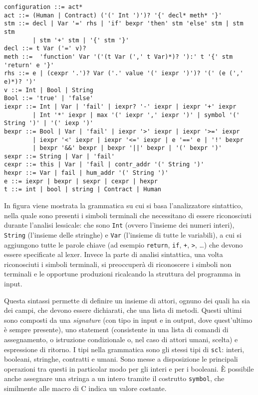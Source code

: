 \documentclass[12pt,a4paper]{report}
\begin{document}
\begin{verbatim}
configuration ::= act*
act ::= (Human | Contract) ('(' Int ')')? '{' decl* meth* '}'
stm ::= decl | Var '=' rhs | 'if' bexpr 'then' stm 'else' stm | stm stm 
        | stm '+' stm | '{' stm '}'
decl ::= t Var ('=' v)?
meth ::=  'function' Var '('(t Var (',' t Var)*)? '):' t '{' stm 'return' e '}'
rhs ::= e | (cexpr '.')? Var ('.' value '(' iexpr ')')? '(' (e (',' e)*)? ')'
v ::= Int | Bool | String 
Bool ::= 'true' | 'false' 
iexpr ::= Int | Var | 'fail' | iexpr? '-' iexpr | iexpr '+' iexpr 
        | Int '*' iexpr | max '(' iexpr ',' iexpr ')' | symbol '(' String ')' | '(' iexp ')'
bexpr ::= Bool | Var | 'fail' | iexpr '>' iexpr | iexpr '>=' iexpr 
        | iexpr '<' iexpr | iexpr '<=' iexpr | e '==' e | '!' bexpr 
        | bexpr '&&' bexpr | bexpr '||' bexpr | '(' bexpr ')'  
sexpr ::= String | Var | 'fail'
cexpr ::= this | Var | 'fail | contr_addr '(' String ')'
hexpr ::= Var | fail | hum_addr '(' String ')'
e ::= iexpr | bexpr | sexpr | cexpr | hexpr 
t ::= int | bool | string | Contract | Human
\end{verbatim}

In figura viene mostrata la grammatica su cui si basa l'analizzatore
sintattico, nella quale sono presenti i simboli terminali che
necessitano di essere riconosciuti durante l'analisi lessicale: che sono
\texttt{Int} (ovvero l'insieme dei numeri interi), \texttt{String}
(l'insieme delle stringhe) e \texttt{Var} (l'insieme di tutte le
variabili), a cui si aggiungono tutte le parole chiave (ad esempio
\texttt{return}, \texttt{if}, \texttt{+}, \texttt{\textgreater{}},
\ldots{}) che devono essere specificate al lexer. Invece la parte di
analisi sintattica, una volta riconosciuti i simboli terminali, si
preoccuperà di riconoscere i simboli non terminali e le opportune
produzioni ricalcando la struttura del programma in input.

Questa sintassi permette di definire un insieme di attori, ognuno dei
quali ha sia dei campi, che devono essere dichiarati, che una lista di
metodi. Questi ultimi sono composti da una \emph{signature} (con tipo in
input e in output, dove quest'ultimo è sempre presente), uno statement
(consistente in una lista di comandi di assegnamento, o istruzione
condizionale o, nel caso di attori umani, scelta) e espressione di
ritorno. I tipi nella grammatica sono gli stessi tipi di \texttt{scl}:
interi, booleani, stringhe, contratti e umani. Sono messe a disposizione
le principali operazioni tra questi in particolar modo per gli interi e
per i booleani. È possibile anche assegnare una stringa a un intero
tramite il costrutto \texttt{symbol}, che similmente alle macro di C
indica un valore costante.
\end{document}
